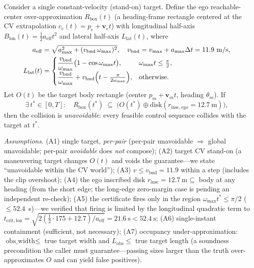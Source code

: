 \begin{proposition}
\label{prop:imminent}
Consider a single constant-velocity (stand-on) target. Define the ego
reachable-center over-approximation $R_{\mathrm{box}}(t)$ (a heading-frame rectangle
centered at the CV extrapolation $c_e(t)=p_e+\bm{v}_e t$) with longitudinal
half-axis $B_{\mathrm{lon}}(t)=\tfrac12 a_{\mathrm{eff}}t^2$ and lateral half-axis
$L_{\mathrm{lat}}(t)$, where
\begin{align}
  a_{\mathrm{eff}} &= \sqrt{a_{\max}^2+(v_{\mathrm{bnd}}\,\omega_{\max})^2},
    \quad v_{\mathrm{bnd}}=v_{\max}+a_{\max}\Delta t=11.9~\mathrm{m/s},\\
  L_{\mathrm{lat}}(t) &=
    \begin{cases}
      \dfrac{v_{\mathrm{bnd}}}{\omega_{\max}}\bigl(1-\cos\omega_{\max}t\bigr),
        & \omega_{\max}t\le\tfrac{\pi}{2},\\[1.2ex]
      \dfrac{v_{\mathrm{bnd}}}{\omega_{\max}}
        + v_{\mathrm{bnd}}\Bigl(t-\tfrac{\pi}{2\omega_{\max}}\Bigr),
        & \text{otherwise.}
    \end{cases}
\end{align}
Let $O(t)$ be the target body rectangle (center $p_m+\bm{v}_m t$, heading
$\theta_m$). If
\begin{equation}
  \exists\, t^\ast\in[0,T]:\quad
  R_{\mathrm{box}}(t^\ast)\;\subseteq\;\bigl(O(t^\ast)\oplus \mathrm{disk}(r_{\mathrm{insc,ego}}=12.7~\mathrm{m})\bigr),
  \label{eq:imminent}
\end{equation}
then the collision is \emph{unavoidable}: every feasible control sequence collides
with the target at $t^\ast$.
\end{proposition}

\emph{Assumptions.} (A1) single target, \emph{per-pair} (per-pair unavoidable
$\Rightarrow$ global unavoidable; per-pair \emph{avoidable} does \emph{not}
compose); (A2) target CV stand-on (a maneuvering target changes $O(t)$ and voids the
guarantee---we state ``unavoidable within the CV world''); (A3) $v\le
v_{\mathrm{bnd}}=11.9$ within a step (includes the clip overshoot); (A4) the ego
inscribed disk $r_{\mathrm{insc}}=12.7~\mathrm{m}\subseteq$ body at any heading
(from the short edge; the long-edge zero-margin case is pending an independent re-check); (A5)
the certificate fires only in the region $\omega_{\max}t^\ast\le\pi/2$
($\le52.4$~s)---we verified that firing is limited by the longitudinal quadratic term
to $t_{\mathrm{crit,lon}}=\sqrt{2(\tfrac12\cdot175+12.7)/a_{\mathrm{eff}}}=21.6~\mathrm{s}<52.4~\mathrm{s}$;
(A6) single-instant containment (sufficient, not necessary); (A7) occupancy
under-approximation: $\text{obs\_width}\le$ true target width and $L_{\mathrm{obs}}\le$
true target length (a soundness precondition the caller must guarantee---passing
sizes larger than the truth over-approximates $O$ and can yield false positives).

